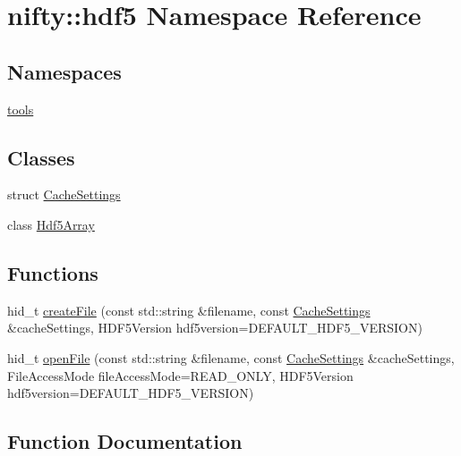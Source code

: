 \hypertarget{namespacenifty_1_1hdf5}{}\section{nifty\+:\+:hdf5 Namespace Reference}
\label{namespacenifty_1_1hdf5}
\subsection*{Namespaces}
\begin{DoxyCompactItemize}
\item 
 \hyperlink{namespacenifty_1_1hdf5_1_1tools}{tools}
\end{DoxyCompactItemize}
\subsection*{Classes}
\begin{DoxyCompactItemize}
\item 
struct \hyperlink{structnifty_1_1hdf5_1_1CacheSettings}{Cache\+Settings}
\item 
class \hyperlink{classnifty_1_1hdf5_1_1Hdf5Array}{Hdf5\+Array}
\end{DoxyCompactItemize}
\subsection*{Functions}
\begin{DoxyCompactItemize}
\item 
hid\+\_\+t \hyperlink{namespacenifty_1_1hdf5_a75c90b819349001bc1cf9e4bbe519462}{create\+File} (const std\+::string \&filename, const \hyperlink{structnifty_1_1hdf5_1_1CacheSettings}{Cache\+Settings} \&cache\+Settings, H\+D\+F5\+Version hdf5version=D\+E\+F\+A\+U\+L\+T\+\_\+\+H\+D\+F5\+\_\+\+V\+E\+R\+S\+I\+ON)
\item 
hid\+\_\+t \hyperlink{namespacenifty_1_1hdf5_a1a87959670d984301cfc2c780099673e}{open\+File} (const std\+::string \&filename, const \hyperlink{structnifty_1_1hdf5_1_1CacheSettings}{Cache\+Settings} \&cache\+Settings, File\+Access\+Mode file\+Access\+Mode=R\+E\+A\+D\+\_\+\+O\+N\+LY, H\+D\+F5\+Version hdf5version=D\+E\+F\+A\+U\+L\+T\+\_\+\+H\+D\+F5\+\_\+\+V\+E\+R\+S\+I\+ON)
\end{DoxyCompactItemize}


\subsection{Function Documentation}
\mbox{\label{namespacenifty_1_1hdf5_a75c90b819349001bc1cf9e4bbe519462}} 
